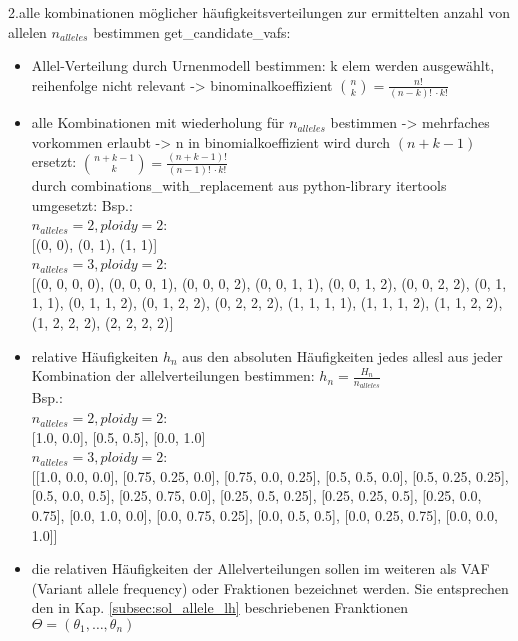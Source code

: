 \noindent 2.alle kombinationen möglicher häufigkeitsverteilungen zur ermittelten anzahl von allelen $ n_{alleles} $ bestimmen get\_candidate\_vafs:\\
\begin{itemize}
	\item Allel-Verteilung durch Urnenmodell bestimmen: k elem werden ausgewählt, reihenfolge nicht relevant -> binominalkoeffizient $\binom{n}{k} = \frac{n!}{(n-k)!\, \cdotp k!}$ \\
	\item alle Kombinationen mit wiederholung für $n_{alleles} $ bestimmen -> mehrfaches vorkommen erlaubt -> n in binomialkoeffizient wird durch $(n + k -1)$ ersetzt: $\binom{n + k - 1}{k} = \frac{(n+k-1)!}{(n-1)!\, \cdotp k!}$\\ 
	durch combinations\_with\_replacement  aus python-library itertools umgesetzt:
	Bsp.: \\	
	$ n_{alleles} = 2, ploidy = 2$: \\
	{[(0, 0), (0, 1), (1, 1)]}\\
	$ n_{alleles} = 3, ploidy = 2$: \\
	{[(0, 0, 0, 0), (0, 0, 0, 1), (0, 0, 0, 2), (0, 0, 1, 1), (0, 0, 1, 2), (0, 0, 2, 2), (0, 1, 1, 1), (0, 1, 1, 2), (0, 1, 2, 2), (0, 2, 2, 2), (1, 1, 1, 1), (1, 1, 1, 2), (1, 1, 2, 2), (1, 2, 2, 2), (2, 2, 2, 2)]}\\
		
	\item relative Häufigkeiten $ h_{n} $  aus den absoluten Häufigkeiten jedes allesl aus jeder Kombination der allelverteilungen bestimmen:  $ h_{n} = \frac{H_{n}} {n_{alleles}} $\\
	Bsp.: \\
	$ n_{alleles} = 2, ploidy = 2$: \\
	{[1.0, 0.0]}, {[0.5, 0.5]}, {[0.0, 1.0]} \\
	$ n_{alleles} = 3, ploidy = 2$: \\
	{[{[1.0, 0.0, 0.0]}, {[0.75, 0.25, 0.0]}, {[0.75, 0.0, 0.25]}, {[0.5, 0.5, 0.0]}, {[0.5, 0.25, 0.25]}, {[0.5, 0.0, 0.5]},
		{[0.25, 0.75, 0.0]}, {[0.25, 0.5, 0.25]}, {[0.25, 0.25, 0.5]}, {[0.25, 0.0, 0.75]}, {[0.0, 1.0, 0.0]}, {[0.0, 0.75, 0.25]}, {[0.0, 0.5, 0.5]}, {[0.0, 0.25, 0.75]}, {[0.0, 0.0, 1.0]}]} \\
	\item die relativen Häufigkeiten der Allelverteilungen sollen im weiteren als VAF (Variant allele frequency) oder Fraktionen bezeichnet werden. Sie entsprechen den in Kap. \ref{subsec:sol_allele_lh} beschriebenen Franktionen $ \Theta = (\theta_{1}, \dots , \theta_{n}) $\\
\end{itemize}

